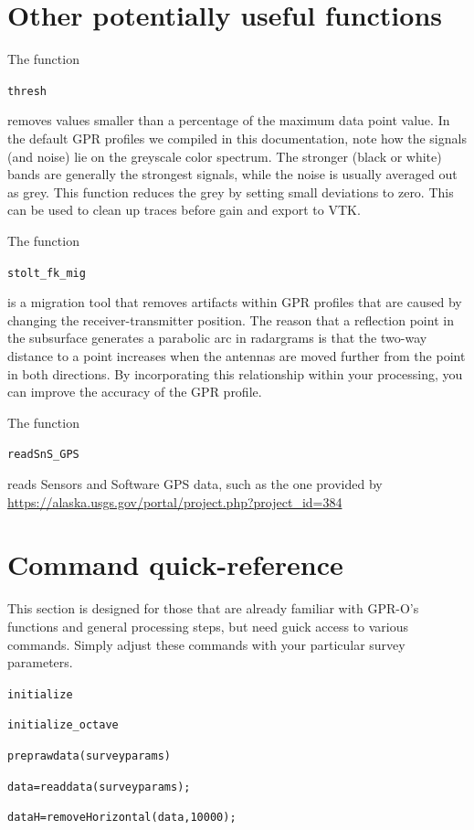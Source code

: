 \documentclass[11pt]{article}
\begin{document}
\section{Other potentially useful functions}

The function

\qquad \verb#thresh#

removes values smaller than a percentage of the maximum data point
value. In the default GPR profiles we compiled in this documentation,
note how the signals (and noise) lie on the greyscale color spectrum. The
stronger (black or white) bands are generally the strongest signals,
while the noise is usually averaged out as grey. This function reduces
the grey by setting small deviations to zero. This can be used to 
clean up traces before gain and export to VTK.

The function

\qquad \verb#stolt_fk_mig#

is a migration tool that removes artifacts within GPR profiles that are
caused by changing the receiver-transmitter position. The reason that a
reflection point in the subsurface generates a parabolic arc in radargrams
is that the two-way distance to a point increases when the antennas are moved
further from the point in both directions. By incorporating this relationship
within your processing, you can improve the accuracy of the GPR profile.

The function

\qquad \verb#readSnS_GPS# 

reads Sensors and Software GPS data, such as the one provided by 
\url{https://alaska.usgs.gov/portal/project.php?project_id=384} 

\section{Command quick-reference}

This section is designed for those that are already familiar with GPR-O's
functions and general processing steps, but need guick access to
various commands. Simply adjust these commands with your particular
survey parameters.

\qquad \verb#initialize#
	
\qquad \verb#initialize_octave#

\qquad \verb#preprawdata(surveyparams)#

\qquad \verb#data=readdata(surveyparams);#

\qquad \verb#dataH=removeHorizontal(data,10000);#
\end{document}
